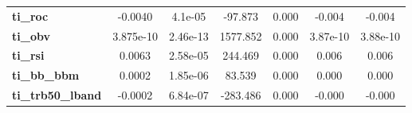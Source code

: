 \begin{center}
\begin{tabular}{lcccccc}
\textbf{ti\_roc}            &      -0.0040  &      4.1e-05     &   -97.873  &         0.000        &       -0.004    &       -0.004     \\
\textbf{ti\_obv}            &    3.875e-10  &     2.46e-13     &  1577.852  &         0.000        &     3.87e-10    &     3.88e-10     \\
\textbf{ti\_rsi}            &       0.0063  &     2.58e-05     &   244.469  &         0.000        &        0.006    &        0.006     \\
\textbf{ti\_bb\_bbm}        &       0.0002  &     1.85e-06     &    83.539  &         0.000        &        0.000    &        0.000     \\
\textbf{ti\_trb50\_lband}   &      -0.0002  &     6.84e-07     &  -283.486  &         0.000        &       -0.000    &       -0.000     \\
\bottomrule
\end{tabular}
\end{center}

